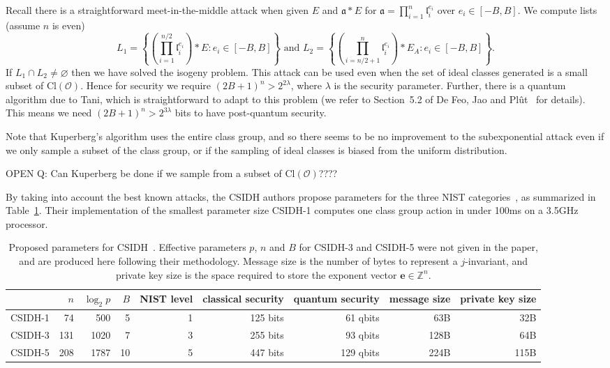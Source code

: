 \documentclass{llncs}
\newcommand{\OO}{\mathcal{O}}
\newcommand{\Z}{\mathbb{Z}}
\newcommand{\Cl}{\text{Cl}}
\renewcommand{\a}{\mathfrak{a}}
\renewcommand{\l}{\mathfrak{l}}
\newcommand{\e}{\textbf{e}}
\begin{document}
Recall there is a straightforward meet-in-the-middle attack when given $E$ and $\a * E$ for $\a = \prod_{i=1}^n \l_i^{e_i}$ over $e_i \in [-B, B]$.
We compute lists (assume $n$ is even)
\[
   L_1 = \left\{ \left( \prod_{i=1}^{n/2} \l_i^{e_i} \right) * E : e_i \in [-B,B] \right\} \text{ \ \  and \ \  }
   L_2 = \left\{ \left( \prod_{i=n/2 + 1}^{n} \l_i^{e_i} \right) * E_A : e_i \in [-B,B] \right\}.
\]
If $L_1 \cap L_2 \ne \varnothing$ then we have solved the isogeny problem.
This attack can be used even when the set of ideal classes generated is a small subset of $\Cl( \OO )$.
Hence for security we require $(2B+1)^n > 2^{2 \lambda}$, where $\lambda$ is the security parameter.
Further, there is a quantum algorithm due to Tani, which is straightforward to adapt to this problem (we refer to Section~5.2 of  De Feo, Jao and Pl{\^{u}}t~\cite{FJP14} for details).
This means we need $(2B+1)^n > 2^{3 \lambda}$ bits to have post-quantum security.

Note that Kuperberg's algorithm uses the entire class group, and so there seems to be no improvement to the subexponential attack even if we only sample a subset of the class group, or if the sampling of ideal classes is biased from the uniform distribution.

OPEN Q: Can Kuperberg be done if we sample from a subset of $\Cl(\OO)$????




By taking into account the best known attacks, the CSIDH authors propose parameters for the three NIST categories~\cite{NIST2016}, as summarized in Table~\ref{tab:csidh-parms}.
Their implementation of the smallest parameter size CSIDH-1 computes one class group action in under 100ms on a 3.5GHz processor.


\begin{table}
  \centering
  \begin{tabular}{l | r | r | r | r | r | r | r | r}
    & $n$ & $\log_2 p$ & $B$ & NIST level & classical security & quantum security & message size & private key size \\
    \hline
    CSIDH-1 &  74 &  500 &  5 & 1 & 125 bits &  61 qbits &  63B &  32B\\
    CSIDH-3 & 131 & 1020 &  7 & 3 & 255 bits &  93 qbits & 128B &  64B\\
    CSIDH-5 & 208 & 1787 & 10 & 5 & 447 bits & 129 qbits & 224B & 115B
  \end{tabular}
  \caption{Proposed parameters for CSIDH~\cite{CLMPR18}.  Effective
    parameters $p$, $n$ and $B$ for CSIDH-3 and CSIDH-5 were not given
    in the paper, and are produced here following their methodology.
    Message size is the number of bytes to represent a $j$-invariant, and private key size is the space required to store the exponent vector $\e \in \Z^n$.}
  \label{tab:csidh-parms}
\end{table}
\end{document}
